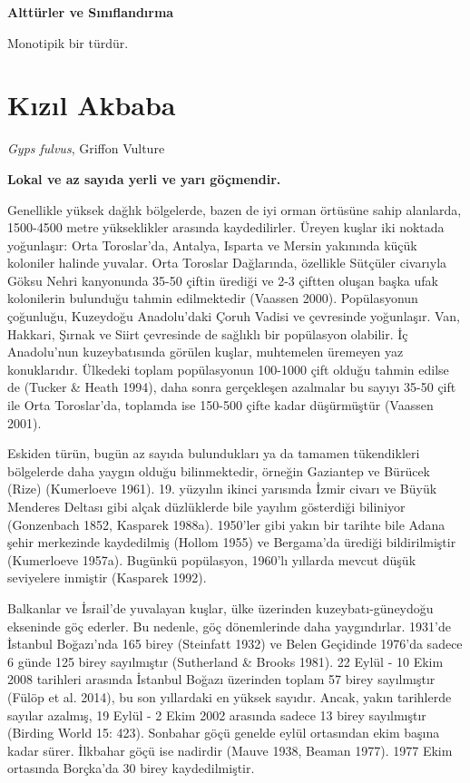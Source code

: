 \documentclass[
  letterpaper,
  DIV=11,
  numbers=noendperiod]{scrreprt}
\begin{document}
\textbf{Alttürler ve Sınıflandırma}

Monotipik bir türdür.

\section{Kızıl Akbaba}\label{kux131zux131l-akbaba}

\emph{Gyps fulvus}, Griffon Vulture

\textbf{Lokal ve az sayıda yerli ve yarı göçmendir.}

Genellikle yüksek dağlık bölgelerde, bazen de iyi orman örtüsüne sahip
alanlarda, 1500-4500 metre yükseklikler arasında kaydedilirler. Üreyen
kuşlar iki noktada yoğunlaşır: Orta Toroslar'da, Antalya, Isparta ve
Mersin yakınında küçük koloniler halinde yuvalar. Orta Toroslar
Dağlarında, özellikle Sütçüler civarıyla Göksu Nehri kanyonunda 35-50
çiftin ürediği ve 2-3 çiftten oluşan başka ufak kolonilerin bulunduğu
tahmin edilmektedir (Vaassen 2000). Popülasyonun çoğunluğu, Kuzeydoğu
Anadolu'daki Çoruh Vadisi ve çevresinde yoğunlaşır. Van, Hakkari, Şırnak
ve Siirt çevresinde de sağlıklı bir popülasyon olabilir. İç Anadolu'nun
kuzeybatısında görülen kuşlar, muhtemelen üremeyen yaz konuklarıdır.
Ülkedeki toplam popülasyonun 100-1000 çift olduğu tahmin edilse de
(Tucker \& Heath 1994), daha sonra gerçekleşen azalmalar bu sayıyı 35-50
çift ile Orta Toroslar'da, toplamda ise 150-500 çifte kadar düşürmüştür
(Vaassen 2001).

Eskiden türün, bugün az sayıda bulundukları ya da tamamen tükendikleri
bölgelerde daha yaygın olduğu bilinmektedir, örneğin Gaziantep ve
Bürücek (Rize) (Kumerloeve 1961). 19. yüzyılın ikinci yarısında İzmir
civarı ve Büyük Menderes Deltası gibi alçak düzlüklerde bile yayılım
gösterdiği biliniyor (Gonzenbach 1852, Kasparek 1988a). 1950'ler gibi
yakın bir tarihte bile Adana şehir merkezinde kaydedilmiş (Hollom 1955)
ve Bergama'da ürediği bildirilmiştir (Kumerloeve 1957a). Bugünkü
popülasyon, 1960'lı yıllarda mevcut düşük seviyelere inmiştir (Kasparek
1992).

Balkanlar ve İsrail'de yuvalayan kuşlar, ülke üzerinden
kuzeybatı-güneydoğu ekseninde göç ederler. Bu nedenle, göç dönemlerinde
daha yaygındırlar. 1931'de İstanbul Boğazı'nda 165 birey (Steinfatt
1932) ve Belen Geçidinde 1976'da sadece 6 günde 125 birey sayılmıştır
(Sutherland \& Brooks 1981). 22 Eylül - 10 Ekim 2008 tarihleri arasında
İstanbul Boğazı üzerinden toplam 57 birey sayılmıştır (Fülöp et al.
2014), bu son yıllardaki en yüksek sayıdır. Ancak, yakın tarihlerde
sayılar azalmış, 19 Eylül - 2 Ekim 2002 arasında sadece 13 birey
sayılmıştır (Birding World 15: 423). Sonbahar göçü genelde eylül
ortasından ekim başına kadar sürer. İlkbahar göçü ise nadirdir (Mauve
1938, Beaman 1977). 1977 Ekim ortasında Borçka'da 30 birey
kaydedilmiştir.
\end{document}
